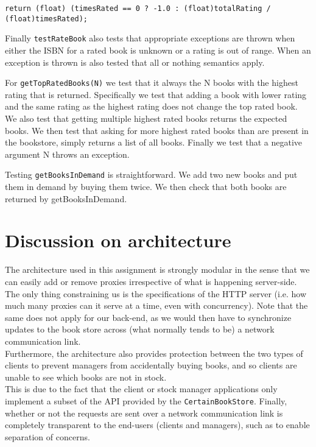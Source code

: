 \documentclass[11pt]{article}
\begin{document}
\begin{center}
\texttt{return (float) (timesRated == 0 ? -1.0 : (float)totalRating / (float)timesRated);}
\end{center}

Finally \texttt{testRateBook} also tests that appropriate exceptions are thrown when either the ISBN for a rated book is unknown or a rating is out of range. When an exception is thrown is also tested that all or nothing semantics apply.  

For \texttt{getTopRatedBooks(N)} we test that it always the N books with the highest rating that is returned. Specifically we test that adding a book with lower rating and the same rating as the highest rating does not change the top rated book. We also test that getting multiple highest rated books returns the expected books. We then test that asking for more highest rated books than are present in the bookstore, simply returns a list of all books. Finally we test that a negative argument N throws an exception.

Testing \texttt{getBooksInDemand} is straightforward. We add two new books and put them in demand by buying them twice. We then check that both books are returned by getBooksInDemand.

\section*{Discussion on architecture}

The architecture used in this assignment is strongly modular in the sense that
we can easily add or remove proxies irrespective of what is happening
server-side. The only thing constraining us is the specifications of the HTTP
server (i.e. how much many proxies can it serve at a time, even with
concurrency). Note that the same does not apply for our back-end, as we would
then have to synchronize updates to the book store across (what normally
tends to be) a network communication link.\\

Furthermore, the architecture also provides protection between the two types of
clients to prevent managers from accidentally buying books, and so clients are
unable to see which books are not in stock.\\

This is due to the fact that the client or stock manager applications only 
implement a subset of the API provided by the \texttt{CertainBookStore}.
Finally, whether or not the requests are sent over a network communication link
is completely transparent to the end-users (clients and managers), such as to
enable separation of concerns.\\
\end{document}

